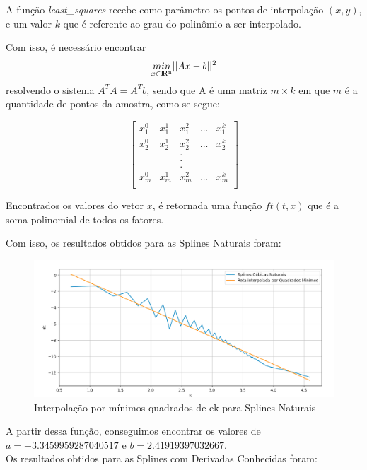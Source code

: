 \documentclass[12pt]{article}
\begin{document}
A função \emph{least\_squares} recebe como parâmetro os pontos de interpolação $(x, y)$, e um valor $k$ que é referente ao grau do polinômio a ser interpolado.

Com isso, é necessário encontrar 
$$ \underset{x \in \rm I\!R^n}{min} ||Ax-b||^2$$ 
resolvendo o sistema $A^T A = A^T b$, sendo que A é uma matriz $m \times k$ em que $m$ é a quantidade de pontos da amostra, como se segue:

$$
    \begin{bmatrix}
        x_1^0 & x_1^1 & x_1^2 & ... & x_1^k\\[10pt]
        x_2^0 & x_2^1 & x_2^2 & ... & x_2^k\\[10pt]
        & & .\\
        & & .\\
        & & .\\[10pt]
        x_m^0 & x_m^1 & x_m^2 & ... & x_m^k\\[10pt]
    \end{bmatrix}
$$

Encontrados os valores do vetor $x$, é retornada uma função $ft(t, x)$ que é a soma polinomial de todos os fatores.

Com isso, os resultados obtidos para as Splines Naturais foram:

\begin{figure}[H]
  \begin{center}
    \includegraphics[width=0.8\linewidth]{splines_quadrados_minimos.png}
  \end{center}
  \caption{Interpolação por mínimos quadrados de ek para Splines Naturais}
  \label{fig:leastsquares1}
\end{figure}

A partir dessa função, conseguimos encontrar os valores de $a = -3.3459959287040517$ e $b = 2.41919397032667$.\\
Os resultados obtidos para as Splines com Derivadas Conhecidas foram:
\end{document}
